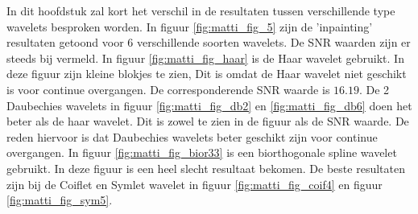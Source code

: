 In dit hoofdstuk zal kort het verschil in de resultaten tussen verschillende type wavelets besproken worden. In figuur \ref{fig:matti_fig_5} zijn de 'inpainting' resultaten getoond voor 6 verschillende soorten wavelets. De SNR waarden zijn er steeds bij vermeld. In figuur \ref{fig:matti_fig_haar} is de Haar wavelet gebruikt. In deze figuur zijn kleine blokjes te zien, Dit is omdat de Haar wavelet niet geschikt is voor continue overgangen. De corresponderende SNR waarde is $16.19$. De 2 Daubechies wavelets in figuur \ref{fig:matti_fig_db2} en \ref{fig:matti_fig_db6} doen het beter als de haar wavelet. Dit is zowel te zien in de figuur als de SNR waarde. De reden hiervoor is dat Daubechies wavelets beter geschikt zijn voor continue overgangen. In figuur \ref{fig:matti_fig_bior33} is een biorthogonale spline wavelet gebruikt. In deze figuur is een heel slecht resultaat bekomen. De beste resultaten zijn bij de Coiflet en Symlet wavelet in figuur \ref{fig:matti_fig_coif4} en figuur \ref{fig:matti_fig_sym5}.


